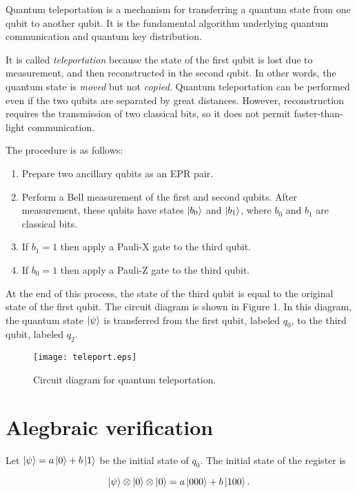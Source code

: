 \documentclass[12pt,letterpaper]{article}
\newcommand\tensor{\otimes}
\begin{document}
Quantum teleportation is a mechanism for transferring a quantum state
from one qubit to another qubit. It is the fundamental algorithm underlying
quantum communication and quantum key distribution. 

It is called \emph{teleportation} because the state of the first qubit
is lost due to measurement, and then reconstructed in the second qubit.
In other words, the quantum state is \emph{moved} but not \emph{copied}.
Quantum teleportation can be performed even if the two qubits are separated
by great distances. However, reconstruction requires the transmission of 
two classical bits, so it does not permit faster-than-light communication. 

The procedure is as follows:

\begin{enumerate}
	\item Prepare two ancillary qubits as an EPR pair.
	\item Perform a Bell measurement of the first and second qubits.
	      After measurement, these qubits have states $\ket{b_0}$ and
	      $\ket{b_1}$, where $b_0$ and $b_1$ are classical bits.
	\item If $b_1 = 1$ then apply a Pauli-X gate to the third qubit.
	\item If $b_0 = 1$ then apply a Pauli-Z gate to the third qubit.
\end{enumerate}

At the end of this process, the state of the third qubit is equal to
the original state of the first qubit. The circuit diagram is shown in
Figure 1. In this diagram, the quantum state $\ket{\psi}$ is transferred 
from the first qubit, labeled $q_0$, to the third qubit, labeled $q_2$.

\begin{figure}[H]
\centering
\texttt{[image: teleport.eps]}
\caption{Circuit diagram for quantum teleportation.}
\end{figure}

\section*{Alegbraic verification}

Let $\ket{\psi} = a \ket{0} + b \ket{1}$ be the initial state of $q_0$.
The initial state of the register is

\begin{equation}
\ket{\psi} \tensor \ket{0} \tensor \ket{0} =
a \ket{000} + b \ket{100}.
\end{equation}
\end{document}
